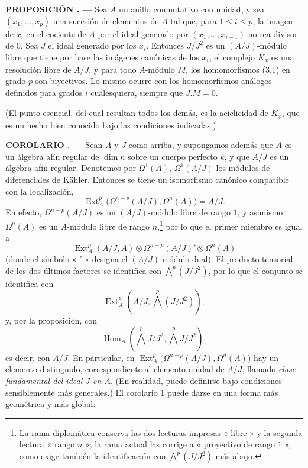 \documentclass[11pt,twoside,openany]{book}
\numberwithin{equation}{section}
\newcommand{\src}[1]{%
  \phantomsection\hypertarget{src:#1}{}%
  \marginpar{\raggedleft\footnotesize\sffamily #1}%
}
\theoremstyle{plain}
\theoremstyle{definition}
\theoremstyle{remark}
\newcommand{\result}[2]{%
  \par\medskip\noindent\textbf{#1%
  \if\relax\detokenize{#2}\relax\else\space#2\fi. ---}\enspace
}
\newcommand{\FgaUnitKey}{frontmatter}
\renewcommand{\src}[1]{%
  \phantomsection\hypertarget{src:\FgaUnitKey:#1}{}%
  \marginpar{\raggedleft\footnotesize\sffamily #1}%
}
\theoremstyle{plain}
\theoremstyle{definition}
\theoremstyle{remark}
\begin{document}
\src{175}
\result{PROPOSICIÓN}{4} Sea $A$ un anillo conmutativo con unidad, y sea
$(x_1,\ldots,x_p)$ una sucesión de elementos de $A$ tal que, para $1\leq i\leq p$,
la imagen de $x_i$ en el cociente de $A$ por el ideal generado por
$(x_1,\ldots,x_{i-1})$ no sea divisor de $0$. Sea $J$ el ideal generado
por los $x_i$. Entonces $J/J^{2}$ es un $(A/J)$-módulo libre que tiene por base las
imágenes canónicas de los $x_i$, el complejo $K_{\underline{x}}$ es una resolución
libre de $A/J$, y para todo $A$-módulo $M$, los homomorfismos (3.1) en
grado $p$ son biyectivos. Lo mismo ocurre con los homomorfismos análogos
definidos para grados $i$ cualesquiera, siempre que $J.M=0$.

(El punto esencial, del cual resultan todos los demás, es la aciclicidad de
$K_{\underline{x}}$, que es un hecho bien conocido bajo las condiciones indicadas.)

\result{COROLARIO}{1} Sean $A$ y $J$ como arriba, y supongamos además que
$A$ es un álgebra afín regular de $\dim n$ sobre un cuerpo perfecto $k$, y
que $A/J$ es un álgebra afín regular. Denotemos por $\Omega^{1}(A)$,
$\Omega^{1}(A/J)$ los módulos de diferenciales de Kähler. Entonces se tiene un
isomorfismo canónico compatible con la localización,
\begin{equation}\tag{3.5}
  \operatorname{Ext}_{A}^{p}\bigl(\Omega^{n-p}(A/J),\Omega^{n}(A)\bigr)=A/J.
\end{equation}
En efecto, $\Omega^{n-p}(A/J)$ es un $(A/J)$-módulo libre de rango $1$, y asimismo
$\Omega^{n}(A)$ es un $A$-módulo libre de rango $n$,\footnote{La rama diplomática
conserva las dos lecturas impresas « libre » y la segunda lectura « rango $n$ »;
la rama actual las corrige a « proyectivo de rango $1$ », como exige también
la identificación con $\bigwedge^{p}(J/J^{2})$ más abajo.}
por lo que el primer miembro es igual a
\[
  \operatorname{Ext}_{A}^{p}(A/J,A)
  \otimes\Omega^{n-p}(A/J)'\otimes\Omega^{n}(A)
\]
(donde el símbolo « $'$ » designa el $(A/J)$-módulo dual). El producto tensorial de los
dos últimos factores se identifica con $\bigwedge^{p}(J/J^{2})$, por lo que el conjunto
se identifica con
\[
  \operatorname{Ext}_{A}^{p}\!\left(A/J,\bigwedge^{p}(J/J^{2})\right),
\]
y, por la proposición, con
\[
  \operatorname{Hom}_{A}\!\left(\bigwedge^{p}J/J^{2},
  \bigwedge^{p}J/J^{2}\right),
\]
es decir, con $A/J$. En particular, en
$\operatorname{Ext}_{A}^{p}\bigl(\Omega^{n-p}(A/J),\Omega^{n}(A)\bigr)$ hay un
elemento distinguido, correspondiente al elemento unidad de $A/J$, llamado
\emph{clase fundamental del ideal $J$ en $A$}. (En realidad, puede
definirse bajo condiciones sensiblemente más generales.) El
corolario 1 puede darse en una forma más geométrica y más global:
\end{document}
